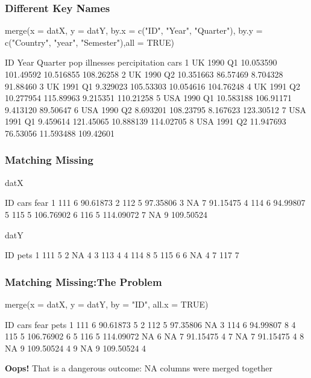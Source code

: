 \documentclass[10pt,american]{beamer}
\renewenvironment{Schunk}{}{}
\renewenvironment{Sinput}{}{}
\begin{document}
\begin{frame}
\frametitle{Different Key Names}
\begin{Schunk}
\begin{Sinput}
 merge(x = datX, y = datY, by.x = c("ID", "Year", "Quarter"), by.y = c("Country", "year", "Semester"),all = TRUE)
\end{Sinput}
\begin{Soutput}
   ID Year Quarter       pop illnesses percipitation      cars
1  UK 1990      Q1 10.053590 101.49592     10.516855 108.26258
2  UK 1990      Q2 10.351663  86.57469      8.704328  91.88460
3  UK 1991      Q1  9.329023 105.53303     10.054616 104.76248
4  UK 1991      Q2 10.277954 115.89963      9.215351 110.21258
5 USA 1990      Q1 10.583188 106.91171      9.413120  89.50647
6 USA 1990      Q2  8.693201 108.23795      8.167623 123.30512
7 USA 1991      Q1  9.459614 121.45065     10.888139 114.02705
8 USA 1991      Q2 11.947693  76.53056     11.593488 109.42601
\end{Soutput}
\end{Schunk}
\end{frame}



\begin{frame}
\frametitle{Matching Missing}
\begin{Schunk}
\begin{Sinput}
 datX
\end{Sinput}
\begin{Soutput}
   ID cars      fear
1 111    6  90.61873
2 112    5  97.35806
3  NA    7  91.15475
4 114    6  94.99807
5 115    5 106.76902
6 116    5 114.09072
7  NA    9 109.50524
\end{Soutput}
\begin{Sinput}
 datY
\end{Sinput}
\begin{Soutput}
   ID pets
1 111    5
2  NA    4
3 113    4
4 114    8
5 115    6
6  NA    4
7 117    7
\end{Soutput}
\end{Schunk}
\end{frame}


\begin{frame}
\frametitle{Matching Missing:The Problem}
\begin{Schunk}
\begin{Sinput}
 merge(x = datX, y = datY, by = "ID", all.x = TRUE)
\end{Sinput}
\begin{Soutput}
   ID cars      fear pets
1 111    6  90.61873    5
2 112    5  97.35806   NA
3 114    6  94.99807    8
4 115    5 106.76902    6
5 116    5 114.09072   NA
6  NA    7  91.15475    4
7  NA    7  91.15475    4
8  NA    9 109.50524    4
9  NA    9 109.50524    4
\end{Soutput}
\end{Schunk}
\textbf{Oops!} That is a dangerous outcome:  NA columns were merged together
\end{frame}
\end{document}
